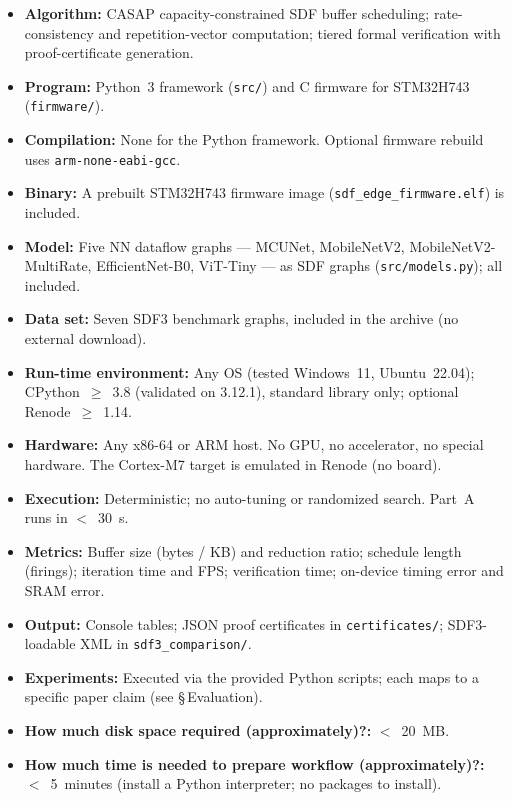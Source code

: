 \documentclass[10pt]{article}
\begin{document}
{\small
\begin{itemize}
  \item {\bf Algorithm: } CASAP capacity-constrained SDF buffer scheduling;
        rate-consistency and repetition-vector computation; tiered formal
        verification with proof-certificate generation.
  \item {\bf Program: } Python~3 framework (\texttt{src/}) and C firmware for
        STM32H743 (\texttt{firmware/}).
  \item {\bf Compilation: } None for the Python framework. Optional firmware
        rebuild uses \texttt{arm-none-eabi-gcc}.
  \item {\bf Binary: } A prebuilt STM32H743 firmware image
        (\texttt{sdf\_edge\_firmware.elf}) is included.
  \item {\bf Model: } Five NN dataflow graphs --- MCUNet, MobileNetV2,
        MobileNetV2-MultiRate, EfficientNet-B0, ViT-Tiny --- as SDF graphs
        (\texttt{src/models.py}); all included.
  \item {\bf Data set: } Seven SDF3 benchmark graphs, included in the archive
        (no external download).
  \item {\bf Run-time environment: } Any OS (tested Windows~11, Ubuntu~22.04);
        CPython~$\geq$~3.8 (validated on 3.12.1), standard library only;
        optional Renode~$\geq$~1.14.
  \item {\bf Hardware: } Any x86-64 or ARM host. No GPU, no accelerator, no
        special hardware. The Cortex-M7 target is emulated in Renode (no board).
  \item {\bf Execution: } Deterministic; no auto-tuning or randomized search.
        Part~A runs in $<$~30~s.
  \item {\bf Metrics: } Buffer size (bytes / KB) and reduction ratio; schedule
        length (firings); iteration time and FPS; verification time; on-device
        timing error and SRAM error.
  \item {\bf Output: } Console tables; JSON proof certificates in
        \texttt{certificates/}; SDF3-loadable XML in \texttt{sdf3\_comparison/}.
  \item {\bf Experiments: } Executed via the provided Python scripts; each maps
        to a specific paper claim (see \S\,Evaluation).
  \item {\bf How much disk space required (approximately)?: } $<$~20~MB.
  \item {\bf How much time is needed to prepare workflow (approximately)?: }
        $<$~5~minutes (install a Python interpreter; no packages to install).

\end{itemize}}
\end{document}
